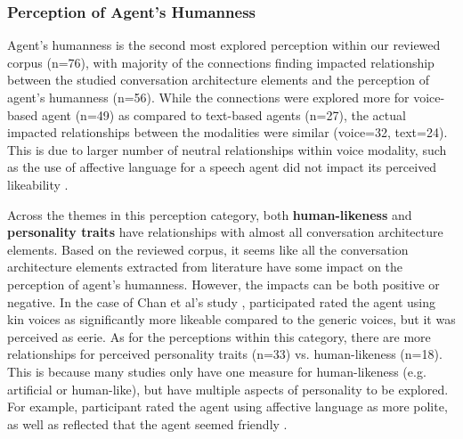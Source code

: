 \documentclass[sigconf,screen,review, anonymous]{acmart}
\newcommand{\cmt}[1]{}%
\begin{document}

\subsubsection{Perception of Agent's Humanness}

Agent's humanness is the second most explored perception within our reviewed corpus (n=76), with majority of the connections finding impacted relationship between the studied conversation architecture elements and the perception of agent's humanness (n=56). While the connections were explored more for voice-based agent (n=49) as compared to text-based agents (n=27), the actual impacted relationships between the modalities were similar (voice=32, text=24). This is due to larger number of neutral relationships within voice modality, such as the use of affective language for a speech agent did not impact its perceived likeability \cite{hu2022polite}\cmt{[76]}.

Across the themes in this perception category, both \textbf{human-likeness} and \textbf{personality traits} have relationships with almost all conversation architecture elements. Based on the reviewed corpus, it seems like all the conversation architecture elements extracted from literature have some impact on the perception of agent's humanness. However, the impacts can be both positive or negative. In the case of Chan et al's study \cite{chan2021kinvoices}\cmt{[74]}, participated rated the agent using kin voices as significantly more likeable compared to the generic voices, but it was perceived as eerie. As for the perceptions within this category, there are more relationships for perceived personality traits (n=33) vs. human-likeness (n=18). This is because many studies only have one measure for human-likeness (e.g. artificial or human-like), but have multiple aspects of personality to be explored. For example, participant rated the agent using affective language as more polite, as well as reflected that the agent seemed friendly \cite{hu2022polite}\cmt{[76]}. 
\end{document}

